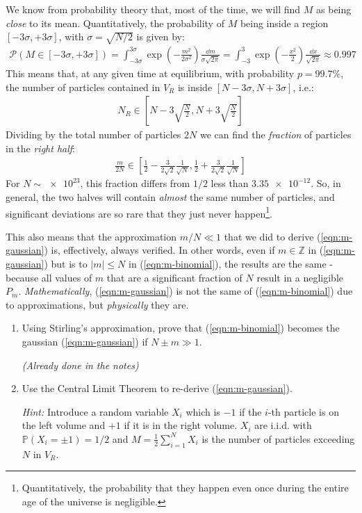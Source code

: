 \documentclass[../template.tex]{subfiles}
\begin{document}
We know from probability theory that, most of the time, we will find $M$ as being \textit{close} to its mean. Quantitatively, the probability of $M$ being inside a region $[-3 \sigma, +3 \sigma]$, with $\sigma = \sqrt{N/2}$ is given by: 
\begin{align*}
    \mathcal{P}(M \in [-3\sigma,+3\sigma]) = \int_{-3 \sigma}^{3 \sigma} \exp\left(-\frac{m^2}{2 \sigma^2} \right) \frac{\dd{m}}{\sigma \sqrt{2 \pi}} = \int_{-3}^3 \exp\left(-\frac{x^2}{2} \right) \frac{\dd{x}}{\sqrt{2 \pi}} \approx 0.997
\end{align*}
This means that, at any given time at equilibrium, with probability $p=99.7\%$, the number of particles contained in $V_R$ is inside $[N-3 \sigma, N+3\sigma]$, i.e.:
\begin{align*}
    N_R \in \left[N-3\sqrt{\frac{N}{2}}, N+3\sqrt{\frac{N}{2}} \right]
\end{align*}
Dividing by the total number of particles $2N$ we can find the \textit{fraction} of particles in the \textit{right half}:
\begin{align*}
    \frac{m}{2N} \in \left[\frac{1}{2}-\frac{3}{2 \sqrt{2}}\frac{1}{\sqrt{N}}, \frac{1}{2} +\frac{3}{2\sqrt{2}}\frac{1}{\sqrt{N}} \right] 
\end{align*}  
For $N \sim \num{e23}$, this fraction differs from $1/2$ less than $\num{3.35e-12}$. So, in general, the two halves will contain \textit{almost} the same number of particles, and significant deviations are so rare that they just never happen\footnote{Quantitatively, the probability that they happen even once during the entire age of the universe is negligible.}. 

\medskip

This also means that the approximation $m/N \ll 1$ that we did to derive (\ref{eqn:m-gaussian}) is, effectively, always verified. In other words, even if $m \in \mathbb{Z}$ in (\ref{eqn:m-gaussian}) but is  to $|m| \leq N$ in (\ref{eqn:m-binomial}), the results are the same - because all values of $m$ that are a significant fraction of $N$ result in a negligible $P_m$. \textit{Mathematically}, (\ref{eqn:m-gaussian}) is not the same of (\ref{eqn:m-binomial}) due to approximations, but \textit{physically} they are.  

\begin{exo}
    \begin{enumerate}    
    \item Using Stirling's approximation, prove that (\ref{eqn:m-binomial}) becomes the gaussian (\ref{eqn:m-gaussian}) if $N\pm m \gg 1$. 
    
    \textit{(Already done in the notes)} 
    \item Use the Central Limit Theorem to re-derive (\ref{eqn:m-gaussian}).
    
    \textit{Hint:} Introduce a random variable $X_i$ which is $-1$ if the $i$-th particle is on the left volume and $+1$ if it is in the right volume. $X_i$ are i.i.d. with $\mathbb{P}(X_i=\pm 1) = 1/2$ and $M=\frac{1}{2}\sum_{i=1}^N X_i$ is the number of particles exceeding $N$ in $V_R$.  
\end{enumerate}
\end{exo}
\end{document}
